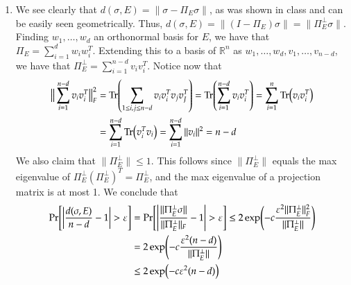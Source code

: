 \documentclass[12pt]{article}
\theoremstyle{definitionstyle}
\def\mbb#1{\mathbb{#1}}
\def \R{\mbb{R}}
\def \ve{\varepsilon}
\newcommand{\mg}[1]{\| #1 \|}
\renewcommand{\P}{\mathrm{Pr}\qty}
\begin{document}
\begin{enumerate}[leftmargin=\labelsep]
\begin{enumerate}
			\item We see clearly that $d(\sigma, E) = \mg{\sigma - \Pi_E \sigma}$, as was shown in class and can be easily seen geometrically. Thus, $d(\sigma, E) = \mg{(I - \Pi_E)\sigma} = \mg{\Pi_E^\perp \sigma}$. Finding $w_1, \ldots, w_d$ an orthonormal basis for $E$, we have that $\Pi_E = \sum_{i=1}^d w_iw_i^T$. Extending this to a basis of $\R^n$ as $w_1, \ldots, w_d, v_1, \ldots, v_{n-d}$, we have that $\Pi_E^\perp = \sum_{i=1}^{n-d} v_iv_i^T$. Notice now that
			\begin{align*}
				\big\| \sum_{i=1}^{n-d} v_iv_i^T \big\|_F^2 &= \Tr(\sum_{1 \leq i,j \leq n-d} v_iv_i^T v_j v_J^T) = \Tr(\sum_{i=1}^{n-d} v_iv_i^T) = \sum_{i=1}^n \Tr(v_i v_i^T) \\
				&= \sum_{i=1}^{n-d} \Tr(v_i^T v_i) = \sum_{i=1}^{n-d} \mg{v_i}^2 = n-d
			\end{align*}
			We also claim that $\mg{\Pi_E^\perp} \leq 1$. This follows since $\mg{\Pi_E^\perp}$ equals the max eigenvalue of $\Pi_E^\perp (\Pi_E^\perp)^T = \Pi_E^\perp$, and the max eigenvalue of a projection matrix is at most 1. We conclude that
			\begin{align*}
				\P[\qty|\frac{d(\sigma, E)}{n-d} - 1| > \ve] &= \P[\qty|\frac{\mg{\Pi_E^\perp \sigma}}{\mg{\Pi_E^\perp}_F} - 1| > \ve] \leq 2\exp(-c \frac{\ve^2 \mg{\Pi_E^\perp}_F^2}{\mg{\Pi_E^\perp}}) \\ &= 2\exp(-c \frac{\ve^2(n-d)}{\mg{\Pi_E^\perp}}) \\
				&\leq 2\exp(-c \ve^2 (n-d))
			\end{align*}
		\end{enumerate}
	\end{enumerate}
\end{document}
